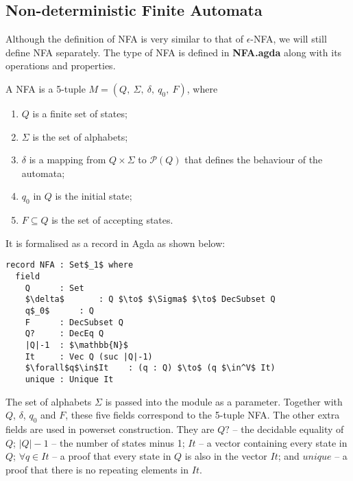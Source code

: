 \subsection{Non-deterministic Finite Automata}
\par Although the definition of NFA is very similar to that of
\(\epsilon\)-NFA, we will still define NFA
separately. The type of NFA is defined in \textbf{NFA.agda} along with
its operations and properties. 

\begin{defn}
\noindent A NFA is a 5-tuple \(M = (Q
,\ \Sigma,\ \delta,\ q_0,\ F)\), where
\begin{enumerate}[nolistsep]
  \item \(Q\) is a finite set of states;
  \item \(\Sigma\) is the set of alphabets;
  \item \(\delta\) is a mapping from \(Q \times \Sigma\) to
    \(\mathcal P \left({Q}\right)\) that defines the behaviour of the automata;
  \item \(q_0\) in \(Q\) is the initial state;
  \item \(F \subseteq Q\) is the set of accepting states. 
\end{enumerate}
\end{defn}

\par It is formalised as a record in Agda as shown below: 

\begin{lstlisting}[mathescape=true,xleftmargin=.3\textwidth]
record NFA : Set$_1$ where
  field
    Q      : Set
    $\delta$       : Q $\to$ $\Sigma$ $\to$ DecSubset Q
    q$_0$      : Q
    F      : DecSubset Q
    Q?     : DecEq Q
    |Q|-1  : $\mathbb{N}$
    It     : Vec Q (suc |Q|-1)
    $\forall$q$\in$It    : (q : Q) $\to$ (q $\in^V$ It)
    unique : Unique It
\end{lstlisting}

\par The set of alphabets \(\Sigma\) is passed into the module as a
parameter. Together with \(Q\), \(\delta\),
\(q_0\) and \(F\), these five fields correspond to the 5-tuple
NFA. The other extra fields are used in powerset construction. They
are \(Q?\) -- the decidable equality of \(Q\);
\(|Q|-1\) -- the number of states minus 1; \(It\) -- a vector containing every state in \(Q\); \(\forall q\in It\)
-- a proof that every state in \(Q\) is also in the vector
\(It\); and \(unique\) -- a proof that there is no repeating elements in
\(It\). 

